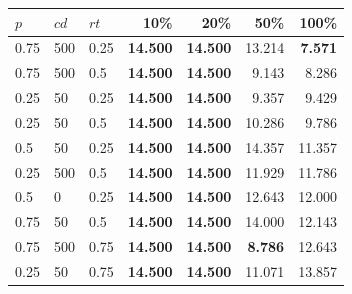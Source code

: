 \begin{tabular}{lllrrrr}
\toprule
\textbf{$p$} & \textbf{$cd$} & \textbf{$rt$} & \textbf{10\%} & \textbf{20\%} & \textbf{50\%} & \textbf{100\%} \\
\midrule
0.75 & 500 & 0.25 & \textbf{14.500} & \textbf{14.500} & 13.214 & \textbf{7.571} \\
0.75 & 500 & 0.5 & \textbf{14.500} & \textbf{14.500} & 9.143 & 8.286 \\
0.25 & 50 & 0.25 & \textbf{14.500} & \textbf{14.500} & 9.357 & 9.429 \\
0.25 & 50 & 0.5 & \textbf{14.500} & \textbf{14.500} & 10.286 & 9.786 \\
0.5 & 50 & 0.25 & \textbf{14.500} & \textbf{14.500} & 14.357 & 11.357 \\
0.25 & 500 & 0.5 & \textbf{14.500} & \textbf{14.500} & 11.929 & 11.786 \\
0.5 & 0 & 0.25 & \textbf{14.500} & \textbf{14.500} & 12.643 & 12.000 \\
0.75 & 50 & 0.5 & \textbf{14.500} & \textbf{14.500} & 14.000 & 12.143 \\
0.75 & 500 & 0.75 & \textbf{14.500} & \textbf{14.500} & \textbf{8.786} & 12.643 \\
0.25 & 50 & 0.75 & \textbf{14.500} & \textbf{14.500} & 11.071 & 13.857 \\
\bottomrule
\end{tabular}
